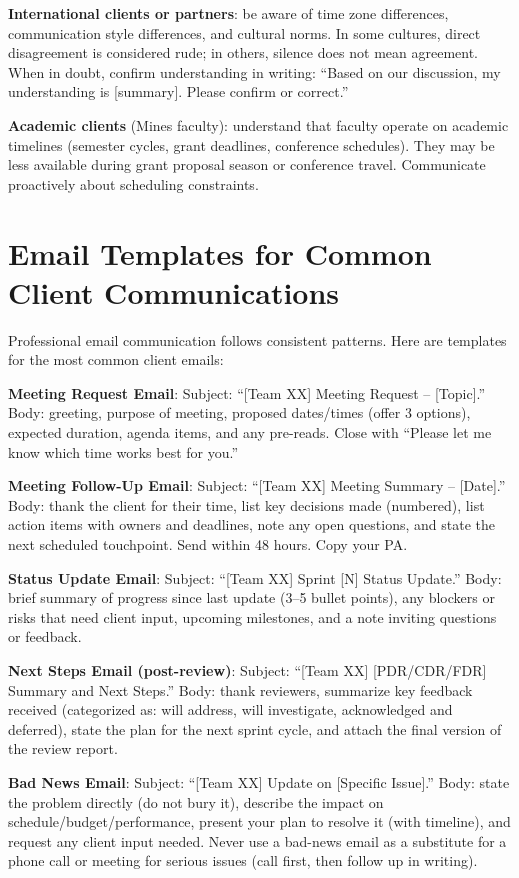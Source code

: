 \textbf{International clients or partners}: be aware of time zone differences, communication style differences, and cultural norms. In some cultures, direct disagreement is considered rude; in others, silence does not mean agreement. When in doubt, confirm understanding in writing: ``Based on our discussion, my understanding is [summary]. Please confirm or correct.''

\textbf{Academic clients} (Mines faculty): understand that faculty operate on academic timelines (semester cycles, grant deadlines, conference schedules). They may be less available during grant proposal season or conference travel. Communicate proactively about scheduling constraints.



\section{Email Templates for Common Client Communications}
Professional email communication follows consistent patterns. Here are templates for the most common client emails:

\textbf{Meeting Request Email}: Subject: ``[Team XX] Meeting Request -- [Topic].'' Body: greeting, purpose of meeting, proposed dates/times (offer 3 options), expected duration, agenda items, and any pre-reads. Close with ``Please let me know which time works best for you.''

\textbf{Meeting Follow-Up Email}: Subject: ``[Team XX] Meeting Summary -- [Date].'' Body: thank the client for their time, list key decisions made (numbered), list action items with owners and deadlines, note any open questions, and state the next scheduled touchpoint. Send within 48 hours. Copy your PA.

\textbf{Status Update Email}: Subject: ``[Team XX] Sprint [N] Status Update.'' Body: brief summary of progress since last update (3--5 bullet points), any blockers or risks that need client input, upcoming milestones, and a note inviting questions or feedback.

\textbf{Next Steps Email (post-review)}: Subject: ``[Team XX] [PDR/CDR/FDR] Summary and Next Steps.'' Body: thank reviewers, summarize key feedback received (categorized as: will address, will investigate, acknowledged and deferred), state the plan for the next sprint cycle, and attach the final version of the review report.

\textbf{Bad News Email}: Subject: ``[Team XX] Update on [Specific Issue].'' Body: state the problem directly (do not bury it), describe the impact on schedule/budget/performance, present your plan to resolve it (with timeline), and request any client input needed. Never use a bad-news email as a substitute for a phone call or meeting for serious issues (call first, then follow up in writing).

